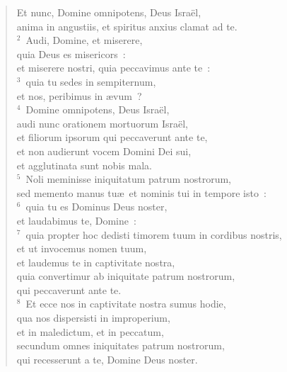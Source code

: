 \begin{flushleft}\begin{verse}\vspace{-19pt}Et nunc, Domine omnipotens, Deus Isra\"el,\\ anima in angustiis, et spiritus anxius clamat ad te.\\
${}^{2}$~Audi, Domine, et miserere,\\ quia Deus es misericors~:\\ et miserere nostri, quia peccavimus ante te~:\\
${}^{3}$~quia tu sedes in sempiternum,\\ et nos, peribimus in \ae vum~?\\
${}^{4}$~Domine omnipotens, Deus Isra\"el,\\ audi nunc orationem mortuorum Isra\"el,\\ et filiorum ipsorum qui peccaverunt ante te,\\ et non audierunt vocem Domini Dei sui,\\ et agglutinata sunt nobis mala.\\
${}^{5}$~Noli meminisse iniquitatum patrum nostrorum,\\ sed memento manus tu\ae\ et nominis tui in tempore isto~:\\
${}^{6}$~quia tu es Dominus Deus noster,\\ et laudabimus te, Domine~:\\
${}^{7}$~quia propter hoc dedisti timorem tuum in cordibus nostris,\\ et ut invocemus nomen tuum,\\ et laudemus te in captivitate nostra,\\ quia convertimur ab iniquitate patrum nostrorum,\\ qui peccaverunt ante te.\\
${}^{8}$~Et ecce nos in captivitate nostra sumus hodie,\\ qua nos dispersisti in improperium,\\ et in maledictum, et in peccatum,\\ secundum omnes iniquitates patrum nostrorum,\\ qui recesserunt a te, Domine Deus noster.\end{verse}\end{flushleft}


